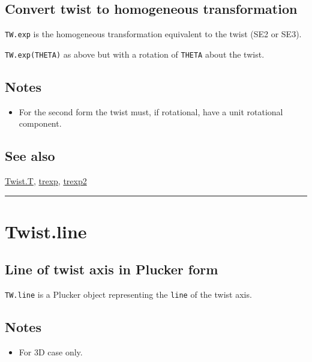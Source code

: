 \subsection*{Convert twist to homogeneous transformation}


\texttt{TW.exp} is the homogeneous transformation equivalent to the twist (SE2 or SE3).



\texttt{TW.exp(THETA)} as above but with a rotation of \texttt{THETA} about the twist.


\subsection*{Notes}
\begin{itemize}
  \item For the second form the twist must, if rotational, have a unit rotational component.
\end{itemize}

\subsection*{See also}


\hyperlink{Twist.T}{\color{blue} Twist.T}, \hyperlink{trexp}{\color{blue} trexp}, \hyperlink{trexp2}{\color{blue} trexp2}

\vspace{1.5ex}\hrule

\hypertarget{Twist.line}{\section*{Twist.line}}
\subsection*{Line of twist axis in Plucker form}


\texttt{TW.line} is a Plucker object representing the \texttt{line} of the twist axis.


\subsection*{Notes}
\begin{itemize}
  \item For 3D case only.
\end{itemize}

